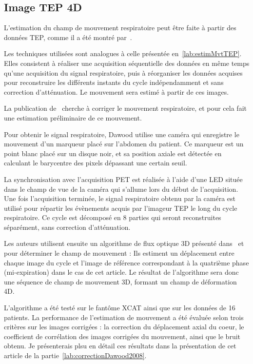 \subsection{Image TEP 4D}
\label{lab:estimMvtTEP4D}
L'estimation du champ de mouvement respiratoire peut être faite à partir des données TEP, comme il a été montré par~\cite{dawood2008respiratory, dawood2006lung}. 

Les techniques utilisées sont analogues à celle présentée en~\ref{lab:estimMvtTEP}. Elles consistent à réaliser une acquisition séquentielle des données en même temps qu'une acquisition du signal respiratoire, puis à réorganiser les données acquises pour reconstruire les différents instants du cycle indépendamment et sans correction d'atténuation. Le mouvement sera estimé à partir de ces images.

La publication de~\cite{dawood2008respiratory} cherche à corriger le mouvement respiratoire, et pour cela fait une estimation préliminaire de ce mouvement. 

Pour obtenir le signal respiratoire, Dawood utilise une caméra qui enregistre le mouvement d'un marqueur placé sur l'abdomen du patient. Ce marqueur est un point blanc placé sur un disque noir, et sa position axiale est détectée en calculant le barycentre des pixels dépassant une certain seuil. 

La synchronisation avec l'acquisition PET est réalisée à l'aide d'une LED située dans le champ de vue de la caméra qui s'allume lors du début de l'acquisition. Une fois l'acquisition terminée, le signal respiratoire obtenu par la caméra est utilisé pour répartir les évènements acquis par l'imageur TEP le long du cycle respiratoire. Ce cycle est décomposé en 8 parties qui seront reconstruites séparément, sans correction d'atténuation.

Les auteurs utilisent ensuite un algorithme de flux optique 3D présenté dans~\cite{dawood2006lung} et~\cite{horn1981determining} pour déterminer le champ de mouvement : Ils estiment un déplacement entre chaque image du cycle et l'image de référence correspondant à la quatrième phase (mi-expiration) dans le cas de cet article. Le résultat de l'algorithme sera donc une séquence de champ de mouvement 3D,  formant un champ de déformation 4D.

L'algorithme a été testé sur le fantôme XCAT ainsi que sur les données de 16 patients. La performance de l'estimation de mouvement a été évaluée selon trois critères sur les images corrigées : la correction du déplacement axial du coeur, le coefficient de corrélation des images corrigées du mouvement, ainsi que le bruit obtenu. Je présenterais plsu en détail ces résultats dans la présentation de cet article de la partie~\ref{lab:correctionDawood2008}.
 
